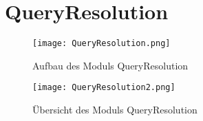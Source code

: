 
\section{QueryResolution}

\begin{figure}[htb]
  	\texttt{[image: QueryResolution.png]}
  	\caption{Aufbau des Moduls QueryResolution}
	\label{fig:Aufbau des Moduls QueryResolution}
\end{figure}

\begin{figure}[htb]
  	\texttt{[image: QueryResolution2.png]}
  	\caption{Übersicht des Moduls QueryResolution}
	\label{fig:Übersicht des Moduls QueryResolution}
\end{figure}


\newpage

\newpage

\newpage




